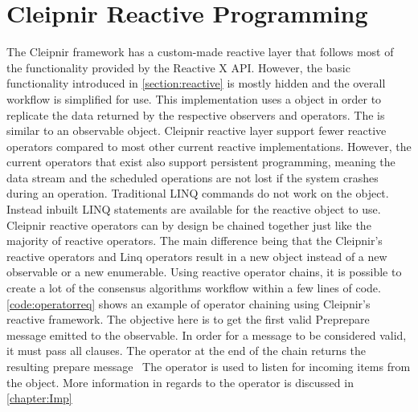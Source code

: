 \section{Cleipnir Reactive Programming}
The Cleipnir framework has a custom-made reactive layer that follows most of the functionality provided by the Reactive X API. However, the basic functionality introduced in \autoref{section:reactive} is mostly hidden and the overall workflow is simplified for use. This implementation uses a  object in order to replicate the data returned by the respective observers and operators. The  is similar to an observable object.
Cleipnir reactive layer support fewer reactive operators compared to most other current reactive implementations. However, the current operators that exist also support persistent programming, meaning the data stream and the scheduled operations are not lost if the system crashes during an operation. Traditional LINQ commands do not work on the  object. Instead inbuilt LINQ statements are available for the reactive  object to use. Cleipnir reactive operators can by design be chained together just like the majority of reactive operators. The main difference being that the Cleipnir's reactive operators and Linq operators result in a new  object instead of a new observable or a new enumerable. Using reactive operator chains, it is possible to create a lot of the consensus algorithms workflow within a few lines of code. \autoref{code:operatorreq} shows an example of operator chaining using Cleipnir’s reactive framework. The objective here is to get the first valid Preprepare message emitted to the observable. In order for a message to be considered valid, it must pass all  clauses. The  operator at the end of the chain returns the resulting prepare message~\cites[p.~6,8,13]{PAPER:PaxosCleipnir, WEB:ReactiveOperator} The  operator is used to listen for incoming items from the   object. More information in regards to the  operator is discussed in \autoref{chapter:Imp}


